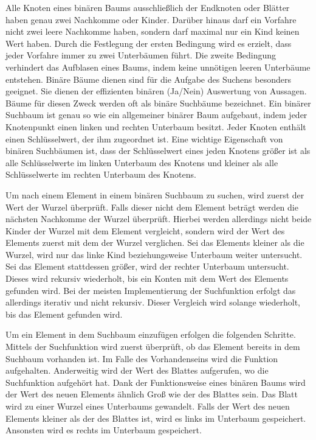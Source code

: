 Alle Knoten eines binären Baums ausschließlich der Endknoten oder Blätter haben genau zwei Nachkomme oder Kinder. Darüber hinaus darf ein Vorfahre nicht zwei leere Nachkomme haben, sondern darf maximal nur ein Kind keinen Wert haben. Durch die Festlegung der ersten Bedingung wird es erzielt, dass jeder Vorfahre immer zu zwei Unterbäumen führt. Die zweite Bedingung verhindert das Aufblasen eines Baums, indem keine unnötigen leeren Unterbäume entstehen. Binäre Bäume dienen sind für die Aufgabe des Suchens besonders geeignet. Sie dienen der effizienten binären (Ja/Nein) Auswertung von Aussagen. Bäume für diesen Zweck werden oft als binäre Suchbäume bezeichnet. Ein binärer Suchbaum ist genau so wie ein allgemeiner binärer Baum aufgebaut, indem jeder Knotenpunkt einen linken und rechten Unterbaum besitzt. Jeder Knoten enthält einen Schlüsselwert, der ihm zugeordnet ist. Eine wichtige Eigenschaft von binären Suchbäumen ist, dass der Schlüsselwert eines jeden Knotens größer ist als alle Schlüsselwerte im linken Unterbaum des Knotens und kleiner als alle Schlüsselwerte im rechten Unterbaum des Knotens. \autocite[94-95]{ollmert_datenstrukturen_2020}

Um nach einem Element in einem binären Suchbaum zu suchen, wird zuerst der Wert der Wurzel überprüft. Falls dieser nicht dem Element beträgt werden die nächsten Nachkomme der Wurzel überprüft. Hierbei werden allerdings nicht beide Kinder der Wurzel mit dem Element vergleicht, sondern wird der Wert des Elements zuerst mit dem der Wurzel verglichen. Sei das Elements kleiner als die Wurzel, wird nur das linke Kind beziehungsweise Unterbaum weiter untersucht. Sei das Element stattdessen größer, wird der rechter Unterbaum untersucht. Dieses wird rekursiv wiederholt, bis ein Konten mit dem Wert des Elements gefunden wird. Bei der meisten Implementierung der Suchfunktion erfolgt das allerdings iterativ und nicht rekursiv. Dieser Vergleich wird solange wiederholt, bis das Element gefunden wird. \autocite[139-140]{knebl_algorithmen_2021}

Um ein Element in dem Suchbaum einzufügen erfolgen die folgenden Schritte. Mittels der Suchfunktion wird zuerst überprüft, ob das Element bereits in dem Suchbaum vorhanden ist. Im Falle des Vorhandenseins wird die Funktion aufgehalten. Anderweitig wird der Wert des Blattes aufgerufen, wo die Suchfunktion aufgehört hat. Dank der Funktionsweise eines binären Baums wird der Wert des neuen Elements ähnlich Groß wie der des Blattes sein. Das Blatt wird zu einer Wurzel eines Unterbaums gewandelt. Falls der Wert des neuen Elements kleiner als der des Blattes ist, wird es links im Unterbaum gespeichert. Ansonsten wird es rechts im Unterbaum gespeichert. \autocite[140]{knebl_algorithmen_2021}

